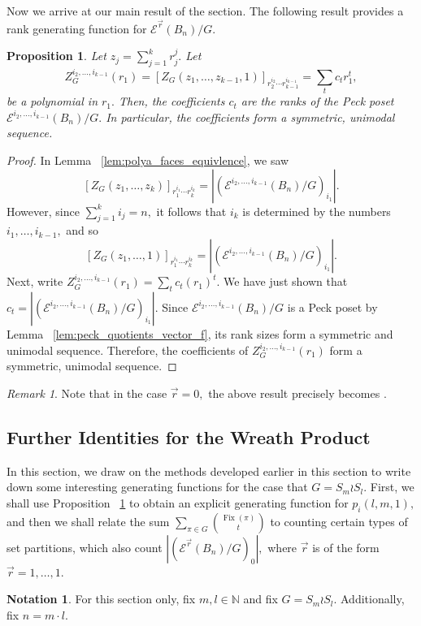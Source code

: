 \documentclass[10 pt]{amsart}
\theoremstyle{plain}
\newtheorem{prop}[thm]{Proposition}
\theoremstyle{definition}
\newtheorem{note}[thm]{Notation}
\theoremstyle{remark}
\newtheorem{rem}[thm]{Remark}
\numberwithin{equation}{section}
\newcommand\ssec{\subsection}
\newcommand\BN{{\mathbb N}}
\renewcommand{\vec}[1]{\overrightarrow{#1}}
\def\Fix{\operatorname{Fix}}
\begin{document}
Now we arrive at our main result of the section. The following result provides a rank generating function for $\mathcal E^{\vec r}(B_n)/G.$

\begin{prop}
\label{prop:rank_gen_fn}
Let $z_j = \sum_{j = 1}^k r_j^j.$ Let $$Z_G^{i_2,\ldots,i_{k-1}}(r_1) =[Z_G(z_1,\ldots, z_{k-1},1)]_{r_2^{i_2}\cdots r_{k-1}^{i_{k-1}}}= \sum_{t}^{}c_tr_1^t,$$ be a polynomial in $r_1.$ Then, the coefficients $c_t$  are the ranks of the Peck poset $\mathcal E^{i_2,\ldots, i_{k-1}}(B_n)/G.$ In particular, the coefficients form a symmetric, unimodal sequence.
\end{prop}
\begin{proof}
In Lemma ~\ref{lem:polya_faces_equivlence}, we saw $$[Z_G(z_1,\ldots, z_k)]_{r_1^{i_1} \cdots r_k^{i_k}}=|(\mathcal E^{i_2,\ldots, i_{k-1}}(B_n)/G)_{i_1}|.$$
However, since $\sum_{j = 1}^k i_j = n,$ it follows that $i_k$ is determined by the numbers $i_1,\ldots, i_{k-1},$ and so 
$$[Z_G(z_1,\ldots, 1)]_{r_1^{i_1} \cdots r_k^{i_k}}=|(\mathcal E^{i_2,\ldots, i_{k-1}}(B_n)/G)_{i_1}|.$$
Next, write $Z_G^{i_2,\ldots,i_{k-1}}(r_1) = \sum_{t} c_t (r_1)^t.$ We have just shown that $c_t = |(\mathcal E^{i_2,\ldots, i_{k-1}}(B_n)/G)_{i_1}|.$ Since $\mathcal E^{i_2,\ldots, i_{k-1}}(B_n)/G$ is a Peck poset by Lemma ~\ref{lem:peck_quotients_vector_f}, its rank sizes form a symmetric and unimodal sequence. Therefore, the coefficients of $Z_G^{i_2,\ldots,i_{k-1}}(r_1)$ form a symmetric, unimodal sequence.
\end{proof}

\begin{rem}
Note that in the case $\vec r = 0,$ the above result precisely becomes \cite[Corollary 7.16]{algebraic_stanley}.
\end{rem}

\ssec{Further Identities for the Wreath Product}
In this section, we draw on the methods developed earlier in this section to write down some interesting generating functions for the case that $G = S_m \wr S_l.$
First, we shall use Proposition ~\ref{prop:rank_gen_fn} to obtain an explicit generating function for $p_i(l,m,1),$ and then we shall relate the sum $\sum_{\pi \in G} \binom{\Fix(\pi)}{t}$ to counting certain types of set partitions, which also count $|(\mathcal E^{\vec r}(B_n)/G)_0|,$ where $\vec r$ is of the form $\vec r = 1,\ldots, 1$.

\begin{note}
For this section only, fix $m,l \in \BN$ and fix $G = S_m \wr S_l.$ Additionally, fix $n = m \cdot l.$
\end{note}
\end{document}
